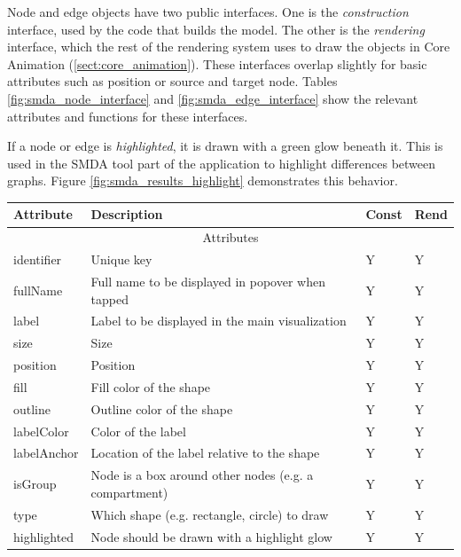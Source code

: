 Node and edge objects have two public interfaces. One is the \emph{construction}
interface, used by the code that builds the model. The other is the
\emph{rendering} interface, which the rest of the rendering system uses to draw
the objects in Core Animation (\ref{sect:core_animation}). These interfaces
overlap slightly for basic attributes such as position or source and target
node. Tables \ref{fig:smda_node_interface} and \ref{fig:smda_edge_interface}
show the relevant attributes and functions for these interfaces.

If a node or edge is \emph{highlighted}, it is drawn with a green glow beneath
it. This is used in the SMDA tool part of the application to highlight
differences between graphs. Figure \ref{fig:smda_results_highlight} demonstrates
this behavior.

\begin{table}[htbp]
\centering
\begin{tabular}{ p{1.5in} p{3in} p{0.3in} p{0.3in}}
    Attribute & Description & Const & Rend \\ \hline
    \hline \multicolumn{4}{c}{Attributes} \\ \hline

    identifier  & Unique key  & Y & Y \\
    fullName  & Full name to be displayed in popover when tapped & Y & Y \\
    label  & Label to be displayed in the main visualization & Y & Y \\
    size  & Size & Y & Y \\
    position  & Position & Y & Y \\

    fill  & Fill color of the shape & Y & Y \\
    outline  & Outline color of the shape & Y & Y \\
    labelColor  & Color of the label & Y & Y \\
    labelAnchor  & Location of the label relative to the shape & Y & Y \\

    isGroup  & Node is a box around other nodes (e.g. a compartment) & Y & Y \\

    type & Which shape (e.g. rectangle, circle) to draw
    & Y & Y \\

    highlighted & Node should be drawn with a highlight glow
    & Y & Y \\


\end{tabular}
\end{table}
